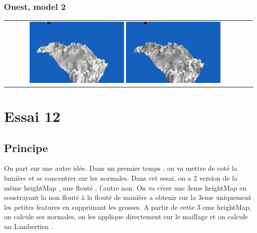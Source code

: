 \documentclass[a4paper]{article}
\begin{document}
\subsubsection{Ouest, model 2}
\begin{tabular}{cc}
\includegraphics[width=0.4\textwidth]{Images/Essais/Essai_11_phong_West_1.png}
\includegraphics[width=0.4\textwidth]{Images/Essais/Essai_11_slint_West_1.png}
\end{tabular}





\section{Essai 12}
\subsection{Principe}

On part sur une autre idée.
Dans un premier temps , on va mettre de coté la lumière et se concentrer sur les normales.
Dans cet essai, on a 2 version de la même heightMap , une flouté , l'autre non. 
On va creer une 3eme heightMap en soustrayant la non flouté à la flouté de manière a obtenir sur la 3eme uniquement les petites features en supprimant les grosses.
A partir de cette 3 eme heightMap, on calcule ses normales, on les applique directement sur le maillage et on calcule un Lambertien .
\end{document}
